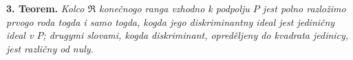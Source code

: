 \documentclass[11pt]{article}
\begin{document}
\setcounter{footnote}{27}

\textbf{3. Teorem.} \emph{Kolco $\mathfrak R$ konečnogo ranga vzhodno k podpolju $P$ jest polno razložimo prvogo roda togda i samo togda, kogda jego diskriminantny ideal jest jediničny ideal v $P$; drugymi slovami, kogda diskriminant, opreděljeny do kvadrata jedinicy, jest različny od nuly.}
\end{document}
